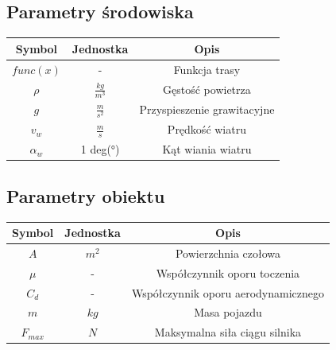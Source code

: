 \documentclass[12pt,a4paper]{article}
\begin{document}
	\subsection{Parametry środowiska}
		\begin{center}
			\begin{tabular}{|c|c|c|}
				\hline
				Symbol & Jednostka & Opis \\
				\hline
				\hline
				$func(x)$ & - & Funkcja trasy \\
				\hline
				$\rho$ & $\frac{kg}{m^3}$ & Gęstość powietrza \\
				\hline
				$g$ & $\frac{m}{s^2}$ & Przyspieszenie grawitacyjne\\
				\hline
				$v_w$ & $\frac{m}{s}$ & Prędkość wiatru \\
				\hline
				$\alpha_w$ & 1 deg(°) & Kąt wiania wiatru \\
				\hline
			\end{tabular}
		\end{center}
	
	\subsection{Parametry obiektu}
	\begin{center}
		\begin{tabular}{|c|c|c|}
			\hline
			Symbol & Jednostka & Opis \\
			\hline
			\hline
			$A$ & $m^2$ & Powierzchnia czołowa \\
			\hline
			$\mu$ & - & Współczynnik oporu toczenia \\
			\hline
			$C_d$ & - & Współczynnik oporu aerodynamicznego \\
			\hline
			$m$ & $kg$ & Masa pojazdu \\
			\hline
			$F_{max}$ & $N$ & Maksymalna siła ciągu silnika \\
			\hline
			
		\end{tabular}
	\end{center}
\end{document}
